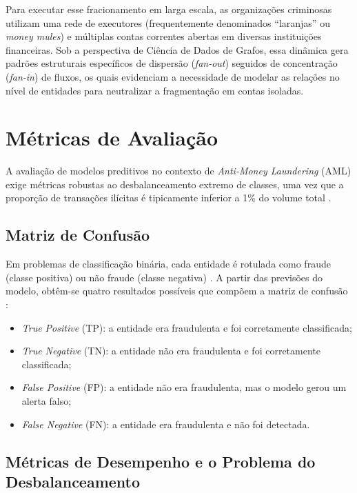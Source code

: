 \documentclass[a4paper,12pt,oneside,onecolumn,final,fleqn]{repUERJ}
\begin{document}
Para executar esse fracionamento em larga escala, as organizações criminosas utilizam uma rede de executores (frequentemente denominados ``laranjas'' ou \textit{money mules}) e múltiplas contas correntes abertas em diversas instituições financeiras. Sob a perspectiva de Ciência de Dados de Grafos, essa dinâmica gera padrões estruturais específicos de dispersão (\textit{fan-out}) seguidos de concentração (\textit{fan-in}) de fluxos, os quais evidenciam a necessidade de modelar as relações no nível de entidades para neutralizar a fragmentação em contas isoladas.

\section{Métricas de Avaliação}

A avaliação de modelos preditivos no contexto de \textit{Anti-Money Laundering} (AML) exige métricas robustas ao desbalanceamento extremo de classes, uma vez que a proporção de transações ilícitas é tipicamente inferior a 1\% do volume total \cite{shukla2025smote}. 

\subsection{Matriz de Confusão}
Em problemas de classificação binária, cada entidade é rotulada como fraude (classe positiva) ou não fraude (classe negativa) \cite{bishop2006pattern}. A partir das previsões do modelo, obtêm-se quatro resultados possíveis que compõem a matriz de confusão \cite{fawcett2006introduction}:
\begin{itemize}
    \item \textit{True Positive} (TP): a entidade era fraudulenta e foi corretamente classificada;
    \item \textit{True Negative} (TN): a entidade não era fraudulenta e foi corretamente classificada;
    \item \textit{False Positive} (FP): a entidade não era fraudulenta, mas o modelo gerou um alerta falso;
    \item \textit{False Negative} (FN): a entidade era fraudulenta e não foi detectada.
\end{itemize}

\subsection{Métricas de Desempenho e o Problema do Desbalanceamento}
\end{document}
